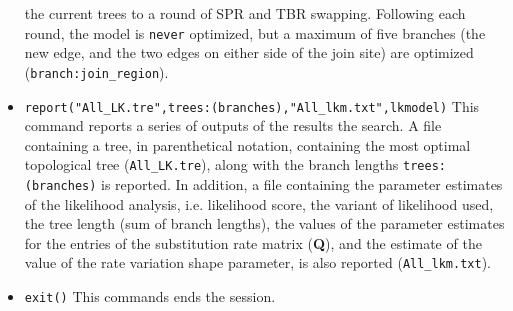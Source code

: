 \begin{itemize}
the current trees to a round of SPR and TBR swapping. Following each round, 
the model is \texttt{never} optimized, but a maximum of five branches 
(the new edge, and the two edges on either side of the join site) are 
optimized (\texttt{branch:join\_region}).
\item \texttt{report("All\_LK.tre",trees:(branches),"All\_lkm.txt",lkmodel)} 
This command reports a series of outputs of the results the search. A file 
containing a tree, in parenthetical notation, containing the most optimal 
topological tree (\texttt{All\_LK.tre}), along with the branch lengths 
\texttt{trees:(branches)} is reported. In addition, a file containing the parameter 
estimates of the likelihood analysis, i.e. likelihood score, the variant of 
likelihood used, the tree length (sum of branch lengths), the values of 
the parameter estimates for the entries of the substitution rate matrix 
(\textbf{Q}), and the estimate of the value of the rate variation shape 
parameter, is also reported (\texttt{All\_lkm.txt}).
\item \texttt{exit()} This commands ends the \poy session.
\end{itemize}